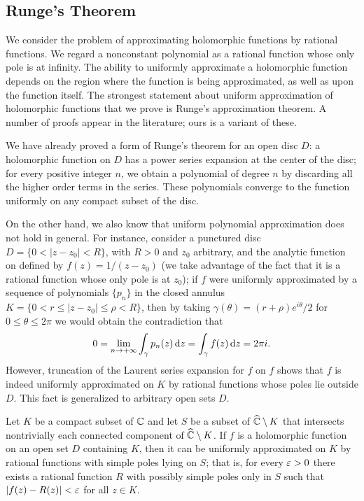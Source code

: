 \subsection{Runge's Theorem}
We consider the problem of approximating holomorphic functions by rational
functions. We regard a nonconstant polynomial as a rational function whose only pole is at infinity. The ability to uniformly approximate a holomorphic function depends on the region where the function is being approximated, as well as upon the function itself. The strongest statement about uniform approximation of holomorphic functions that we prove is Runge's approximation theorem. A number of proofs appear in the literature; ours is a variant of these.\par
We have already proved a form of Runge's theorem for an open disc $D$: a holomorphic function on $D$ has a power series expansion at the center of the disc; for every positive integer $n$, we obtain a polynomial of degree $n$ by discarding all the higher order terms in the series. These polynomials converge to the function uniformly on any compact subset of the disc.\par
On the other hand, we also know that uniform polynomial approximation does not hold in general. For instance, consider a punctured disc $D=\{0<|z-z_0|<R\}$, with $R>0$ and $z_0$ arbitrary, and the analytic function on defined by $f(z)=1/(z-z_0)$ (we take advantage of the fact that it is a rational function whose only pole is at $z_0$); if $f$ were uniformly approximated by a sequence of polynomials $\{p_n\}$ in the closed annulus $K=\{0<r\leq|z-z_0|\leq\rho<R\}$, then by taking $\gamma(\theta)=(r+\rho)e^{i\theta}/2$ for $0\leq\theta\leq 2\pi$ we would obtain the contradiction that
\[0=\lim_{n\to+\infty}\int_{\gamma}p_n(z)\mathop{}\!\mathrm{d} z=\int_{\gamma}f(z)\mathop{}\!\mathrm{d} z=2\pi i.\]
However, truncation of the Laurent series expansion for $f$ on $f$ shows that $f$ is indeed uniformly approximated on $K$ by rational functions whose poles lie outside $D$. This fact is generalized to arbitrary open sets $D$.
\begin{theorem}\label{Runge theorem}
Let $K$ be a compact subset of $\mathbb{C}$ and let $S$ be a subset of $\widehat{\mathbb{C}}\setminus K$ that intersects nontrivially each connected component of $\widehat{\mathbb{C}}\setminus K$. If $f$ is a holomorphic function on an open set $D$ containing $K$, then it can be uniformly approximated on $K$ by rational functions with simple poles lying on $S$; that is, for every $\varepsilon>0$ there exists a rational function $R$ with possibly simple poles only in $S$ such that $|f(z)-R(z)|<\varepsilon$ for all $z\in K$.
\end{theorem}
